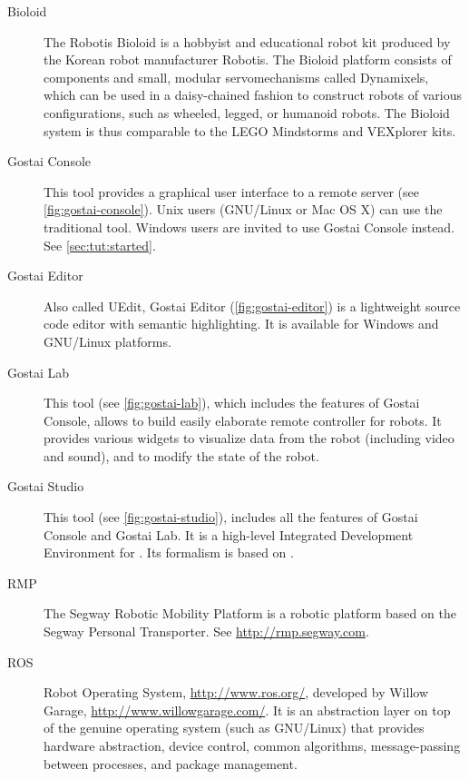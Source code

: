 \begin{description}
\item[Bioloid] The Robotis Bioloid is a hobbyist and educational robot kit
  produced by the Korean robot manufacturer Robotis. The Bioloid platform
  consists of components and small, modular servomechanisms called
  Dynamixels, which can be used in a daisy-chained fashion to construct
  robots of various configurations, such as wheeled, legged, or humanoid
  robots. The Bioloid system is thus comparable to the LEGO Mindstorms and
  VEXplorer kits.

\item[Gostai Console] This tool provides a graphical user interface to a
  remote \urbi server (see \autoref{fig:gostai-console}).  Unix users
  (GNU/Linux or Mac OS X) can use the traditional  tool.
  Windows users are invited to use Gostai Console instead.  See
  \autoref{sec:tut:started}.


\item[Gostai Editor] Also called UEdit, Gostai \us Editor
  (\autoref{fig:gostai-editor}) is a lightweight \us source code editor with
  semantic highlighting. It is available for Windows and GNU/Linux
  platforms.


\item[Gostai Lab] This tool (see \autoref{fig:gostai-lab}), which
  includes the features of Gostai Console, allows to build easily
  elaborate remote controller for robots.  It provides various widgets
  to visualize data from the robot (including video and sound), and to
  modify the state of the robot.


\item[Gostai Studio] This tool (see \autoref{fig:gostai-studio}),
  includes all the features of Gostai Console and Gostai Lab.  It is a
  high-level Integrated Development Environment for \urbi.  Its
  formalism is based on .


\item[RMP] The Segway Robotic Mobility Platform is a robotic platform based
  on the Segway Personal Transporter.  See \url{http://rmp.segway.com}.

\item[ROS] Robot Operating System, \url{http://www.ros.org/}, developed by
  Willow Garage, \url{http://www.willowgarage.com/}.  It is an abstraction
  layer on top of the genuine operating system (such as GNU/Linux) that
  provides hardware abstraction, device control, common algorithms,
  message-passing between processes, and package management.


\end{description}

